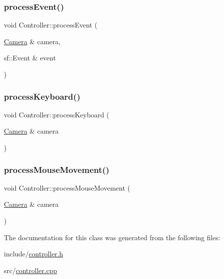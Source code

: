 \subsubsection{\texorpdfstring{process\+Event()}{processEvent()}}
{\footnotesize\ttfamily void Controller\+::process\+Event (\begin{DoxyParamCaption}\item[{\hyperlink{classCamera}{Camera} \&}]{camera,  }\item[{sf\+::\+Event \&}]{event }\end{DoxyParamCaption})}

\mbox{\label{classController_a2eedf6f8321610d8701b041d726f389d}} 
\subsubsection{\texorpdfstring{process\+Keyboard()}{processKeyboard()}}
{\footnotesize\ttfamily void Controller\+::process\+Keyboard (\begin{DoxyParamCaption}\item[{\hyperlink{classCamera}{Camera} \&}]{camera }\end{DoxyParamCaption})}

\mbox{\label{classController_af1e42e9504275c0b2d6021495fce1f7c}} 
\subsubsection{\texorpdfstring{process\+Mouse\+Movement()}{processMouseMovement()}}
{\footnotesize\ttfamily void Controller\+::process\+Mouse\+Movement (\begin{DoxyParamCaption}\item[{\hyperlink{classCamera}{Camera} \&}]{camera }\end{DoxyParamCaption})}



The documentation for this class was generated from the following files\+:\begin{DoxyCompactItemize}
\item 
include/\hyperlink{controller_8h}{controller.\+h}\item 
src/\hyperlink{controller_8cpp}{controller.\+cpp}\end{DoxyCompactItemize}
